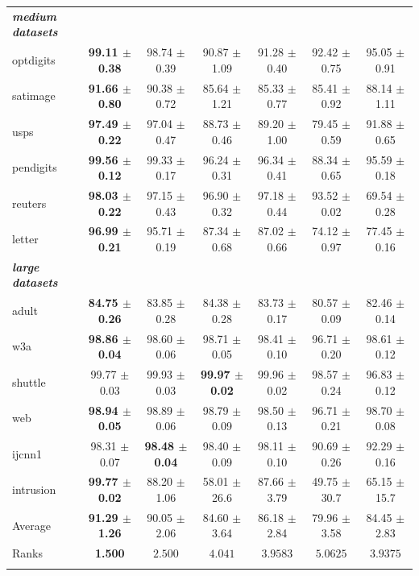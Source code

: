\documentclass[reqno]{vcuthesis}
\numberwithin{equation}{chapter}
\begin{document}
\begin{table}[t!]
\begin{tabularx}{\textwidth}{l@{\extracolsep{\fill}}cccccc}
\textbf{\textit{medium datasets}} & & & & & & \\
optdigits & \textbf{99.11 $\pm$ 0.38} & 98.74 $\pm$ 0.39 & 90.87 $\pm$ 1.09 & 91.28 $\pm$ 0.40 & 92.42 $\pm$ 0.75 & 95.05 $\pm$ 0.91 \\
satimage & \textbf{91.66 $\pm$ 0.80} & 90.38 $\pm$ 0.72 & 85.64 $\pm$ 1.21 & 85.33 $\pm$ 0.77 & 85.41 $\pm$ 0.92 & 88.14 $\pm$ 1.11 \\
usps & \textbf{97.49 $\pm$ 0.22} & 97.04 $\pm$ 0.47 & 88.73 $\pm$ 0.46 & 89.20 $\pm$ 1.00 & 79.45 $\pm$ 0.59 & 91.88 $\pm$ 0.65 \\
pendigits & \textbf{99.56 $\pm$ 0.12} & 99.33 $\pm$ 0.17 & 96.24 $\pm$ 0.31 & 96.34 $\pm$ 0.41 & 88.34 $\pm$ 0.65 & 95.59 $\pm$ 0.18 \\
reuters & \textbf{98.03 $\pm$ 0.22} & 97.15 $\pm$ 0.43 & 96.90 $\pm$ 0.32 & 97.18 $\pm$ 0.44 & 93.52 $\pm$ 0.02 & 69.54 $\pm$ 0.28 \\
letter & \textbf{96.99 $\pm$ 0.21} & 95.71 $\pm$ 0.19 & 87.34 $\pm$ 0.68 & 87.02 $\pm$ 0.66 & 74.12 $\pm$ 0.97 & 77.45 $\pm$ 0.16 \\
\textbf{\textit{large datasets}} & & & & & & \\
adult & \textbf{84.75 $\pm$ 0.26} & 83.85 $\pm$ 0.28 & 84.38 $\pm$ 0.28 & 83.73 $\pm$ 0.17 & 80.57 $\pm$ 0.09 & 82.46 $\pm$ 0.14 \\
w3a & \textbf{98.86 $\pm$ 0.04} & 98.60 $\pm$ 0.06 & 98.71 $\pm$ 0.05 & 98.41 $\pm$ 0.10 & 96.71 $\pm$ 0.20 & 98.61 $\pm$ 0.12 \\
shuttle & 99.77 $\pm$ 0.03 & 99.93 $\pm$ 0.03 & \textbf{99.97 $\pm$ 0.02} & 99.96 $\pm$ 0.02 & 98.57 $\pm$ 0.24 & 96.83 $\pm$ 0.12 \\
web & \textbf{98.94 $\pm$ 0.05} & 98.89 $\pm$ 0.06 & 98.79 $\pm$ 0.09 & 98.50 $\pm$ 0.13 & 96.71 $\pm$ 0.21 & 98.70 $\pm$ 0.08 \\
ijcnn1 & 98.31 $\pm$ 0.07 & \textbf{98.48 $\pm$ 0.04} & 98.40 $\pm$ 0.09 & 98.11 $\pm$ 0.10 & 90.69 $\pm$ 0.26 & 92.29 $\pm$ 0.16 \\
intrusion & \textbf{99.77 $\pm$ 0.02} & 88.20 $\pm$ 1.06 & 58.01 $\pm$ 26.6 & 87.66 $\pm$ 3.79 & 49.75 $\pm$ 30.7 & 65.15 $\pm$ 15.7 \\
\noalign{\smallskip}\hline\noalign{\smallskip}
Average & \textbf{91.29 $\pm$ 1.26} & 90.05 $\pm$ 2.06 & 84.60 $\pm$ 3.64 & 86.18 $\pm$ 2.84 & 79.96 $\pm$ 3.58 & 84.45 $\pm$ 2.83 \\
Ranks & \textbf{1.500} & $2.500$ & $4.041$ & $3.9583$ & $5.0625$ & $3.9375$ \\
\noalign{\smallskip}\hline\noalign{\smallskip}
\end{tabularx}
\begin{minipage}{0.9\textwidth}
\centering
{}
\end{minipage}
\end{table}
\end{document}
